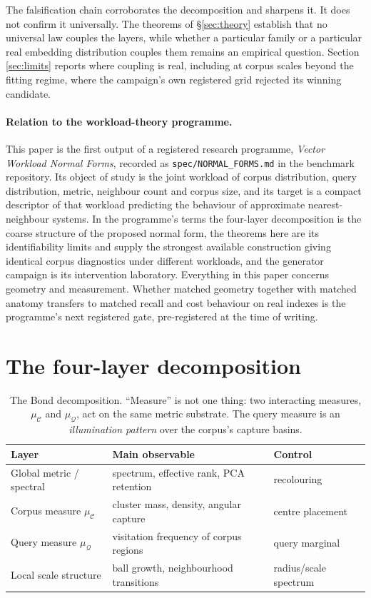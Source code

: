 \documentclass[11pt]{article}
\newcommand{\muC}{\mu_{\mathcal{C}}}
\newcommand{\muQ}{\mu_{\mathcal{Q}}}
\begin{document}
The falsification chain corroborates the decomposition and sharpens it. It
does not confirm it universally. The theorems of \S\ref{sec:theory} establish
that no universal law couples the layers, while whether a particular family or
a particular real embedding distribution couples them remains an empirical
question. Section \ref{sec:limits} reports where coupling is real, including
at corpus scales beyond the fitting regime, where the campaign's own
registered grid rejected its winning candidate.

\paragraph{Relation to the workload-theory programme.} This paper is the
first output of a registered research programme, \emph{Vector Workload
Normal Forms}, recorded as \texttt{spec/NORMAL\_FORMS.md} in the benchmark
repository. Its object of study is the joint workload of corpus distribution,
query distribution, metric, neighbour count and corpus size, and its target is
a compact descriptor of that workload predicting the behaviour of approximate
nearest-neighbour systems. In the programme's terms the four-layer
decomposition is the coarse structure of the proposed normal form, the
theorems here are its identifiability limits and supply the strongest
available construction giving identical corpus diagnostics under different
workloads, and the generator campaign is its intervention laboratory.
Everything in this paper concerns geometry and measurement. Whether matched
geometry together with matched anatomy transfers to matched recall and cost
behaviour on real indexes is the programme's next registered gate,
pre-registered at the time of writing.

\section{The four-layer decomposition}\label{sec:decomposition}

\begin{table}[h]\centering\small
\begin{tabular}{lll}
\toprule
Layer & Main observable & Control \\
\midrule
Global metric / spectral & spectrum, effective rank, PCA retention & recolouring \\
Corpus measure $\muC$ & cluster mass, density, angular capture & centre placement \\
Query measure $\muQ$ & visitation frequency of corpus regions & query marginal \\
Local scale structure & ball growth, neighbourhood transitions & radius/scale spectrum \\
\bottomrule
\end{tabular}
\caption{The Bond decomposition. ``Measure'' is not one thing: two interacting
measures, $\muC$ and $\muQ$, act on the same metric substrate. The query measure
is an \emph{illumination pattern} over the corpus's capture basins.}
\label{tab:layers}
\end{table}
\end{document}

